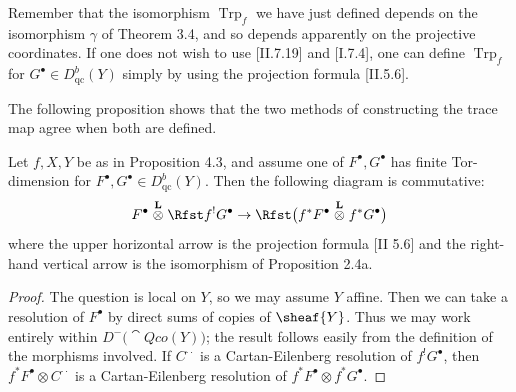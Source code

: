 \setcounter{page}{158}
\begin{remark}
Remember that the isomorphism \(\operatorname{Trp}_f\) we have just defined depends on the isomorphism \(\gamma\) of Theorem 3.4, and so depends apparently on the projective coordinates. If one does not wish to use [II.7.19] and [I.7.4], one can define \(\operatorname{Trp}_f\) for \(G^\bullet \in D_{\mathrm{qc}}^b(Y)\) simply by using the projection formula [II.5.6].
\end{remark}

The following proposition shows that the two methods of constructing the trace map agree when both are defined.

\begin{proposition}
Let \(f,X,Y\) be as in Proposition 4.3, and assume one of \(F^\bullet, G^\bullet\) has finite Tor-dimension for \(F^\bullet,G^\bullet \in D_{\mathrm{qc}}^b(Y)\). Then the following diagram is commutative:
\[
F^\bullet \stackrel{\mathbf{L}}{\otimes} \Rfst f^! G^\bullet
\to \Rfst\bigl(f^* F^\bullet \stackrel{\mathbf{L}}{\otimes} f^* G^\bullet\bigr)
\]
where the upper horizontal arrow is the projection formula [II 5.6] and the right-hand vertical arrow is the isomorphism of Proposition 2.4a.
\end{proposition}

\setcounter{page}{159}
\begin{proof}
The question is local on \(Y\), so we may assume \(Y\) affine. Then we can take a resolution of \(F^\bullet\) by direct sums of copies of \(\sheaf{Y}\). Thus we may work entirely within \(D^-\bigl(\cat{Qco}(Y)\bigr)\); the result follows easily from the definition of the morphisms involved. If \(C^{\cdot\cdot}\) is a Cartan-Eilenberg resolution of \(f^! G^\bullet\), then \(f^* F^\bullet \otimes C^{\cdot\cdot}\) is a Cartan-Eilenberg resolution of \(f^* F^\bullet \otimes f^* G^\bullet\).
\end{proof}